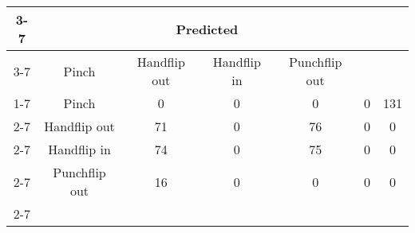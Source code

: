 \documentclass{standalone}
\begin{document}
 
 \begin{tabular}{|c |c |c |c |c |c |c |}
\cline{3-7}\multicolumn{2}{c|}{} & \multicolumn{5}{c|}{Predicted} \\ 
\cline{3-7} \multicolumn{2}{c |}{ } & Pinch & Handflip out & Handflip in & Punchflip out\\ 
\cline{1-7}\multirow{5}{*}{\rotatebox[origin=c]{90}{Actual}} & Pinch & 0 & 0 & 0 & 0 & 131\\ 
 \cline{2-7} & Handflip out & 71 & 0 & 76 & 0 & 0\\ 
 \cline{2-7} & Handflip in & 74 & 0 & 75 & 0 & 0\\ 
 \cline{2-7} & Punchflip out & 16 & 0 & 0 & 0 & 0\\ 
 \cline{2-7}\hline \end{tabular}
 
\end{document}
